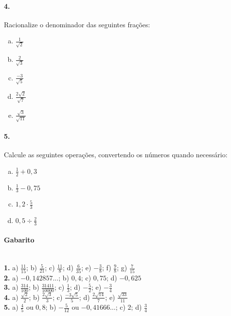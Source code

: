 \documentclass[a4paper,twocolumn,12pt]{article}
\begin{document}
\paragraph*{4. } Racionalize o denominador das seguintes frações:
\begin{enumerate}[a)]
\item $\frac{1}{\sqrt{2}}$
\item $\frac{2}{\sqrt{3}}$
\item $\frac{-3}{\sqrt{5}}$
\item $\frac{2\sqrt{2}}{\sqrt{7}}$
\item $\frac{\sqrt{3}}{\sqrt{11}}$
\end{enumerate}

\paragraph*{5.} Calcule as seguintes operações, convertendo os números quando necessário:
\begin{enumerate}[a)]
\item $\frac{1}{2} + 0,\!3$
\item $\frac{1}{3} - 0,\!75$
\item $1,\!2\cdot\frac{5}{3} $
\item $0,\!5\div\frac{2}{3}$
\end{enumerate}
\vfill

{\footnotesize\color{darkgray}
\paragraph*{Gabarito} \hspace*{\fill}\\ 
\textbf{1.} a) $\frac{11}{15}$; b) $\frac{5}{21}$; c) $\frac{11}{8}$; d) $\frac{6}{35}$; e) $-\frac{3}{8}$; f) $\frac{9}{8}$; g) $\frac{7}{15}$\\
\textbf{2.} a) $-0,142857...$; b) $0,4$; c) $0,75$; d) $-0,625$\\
\textbf{3.} a) $\frac{314}{100}$; b) $\frac{31411}{10000}$; c) $\frac{1}{3}$; d) $-\frac{5}{2}$; e) $-\frac{3}{4}$\\
\textbf{4.} a) $\frac{\sqrt{2}}{2}$; b) $\frac{2\sqrt{3}}{3}$; c) $\frac{-3\sqrt{5}}{5}$; d) $\frac{2\sqrt{14}}{7}$; e) $\frac{\sqrt{33}}{11}$\\
\textbf{5.} a) $\frac{4}{5}$ ou $0,\!8$; b) $-\frac{5}{12}$ ou $-0,41666\ldots$; c) $2$; d) $\frac{3}{4}$
}
\end{document}
